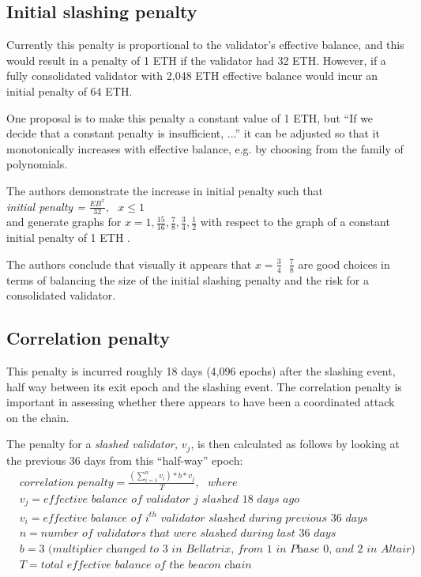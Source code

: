 \documentclass{article}
\begin{document}
\subsection{Initial slashing penalty}
Currently this penalty is proportional to the validator's effective balance,
and this would result in a penalty of 1 ETH if the validator had 32 ETH.
However, if a fully consolidated validator with 2,048 ETH effective balance
would incur an initial penalty of 64 ETH.

One proposal is to make this penalty a constant value of 1 ETH, but ``If we
decide that a constant penalty is insufficient, ...'' it can be adjusted so
that it monotonically increases with effective balance, e.g. by choosing from
the family of polynomials.


The authors demonstrate the increase in initial penalty such that \\
\textit{initial penalty =} $\frac{EB^x}{32}, \texttt{ } x \leqslant 1$ \\

and generate graphs for $x=1, \frac{15}{16}, \frac{7}{8}, \frac{3}{4},
\frac{1}{2}$ with respect to the graph of a constant initial penalty of 1 ETH
\cite{Neuder2023d}.

The authors conclude that visually it appears that $x = \frac{3}{4} \texttt{ }
\frac{7}{8}$ are good choices in terms of balancing the size of the initial
slashing penalty and the risk for a consolidated validator.

\subsection{Correlation penalty}
This penalty is incurred roughly 18 days (4,096 epochs) after the slashing
event, half way between its exit epoch and the slashing event. The correlation
penalty is important in assessing whether there appears to have been a
coordinated attack on the chain.

The penalty for a \textit{slashed validator,} $ v_j$, is then calculated as
follows by looking at the previous 36 days from this ``half-way'' epoch:
\begin{equation*}
  \begin{split}
& \textit{correlation penalty} = \frac{\left( \sum_{i=1}^n v_i  \right) * b * v_j}{T}, \texttt{ } where \\
& v_j = \textit{effective balance of validator j slashed 18 days ago} \\
& v_i = \textit{effective balance of } i^{th} \textit{ validator slashed during previous 36 days} \\
& n = \textit{number of validators that were slashed during last 36 days} \\
& b =3 \textit{ (multiplier changed to 3 in Bellatrix, from 1  in Phase 0, and 2 in Altair)} \\
& T = \textit{total effective balance of the beacon chain}
  \end{split}
\end{equation*}
\end{document}
